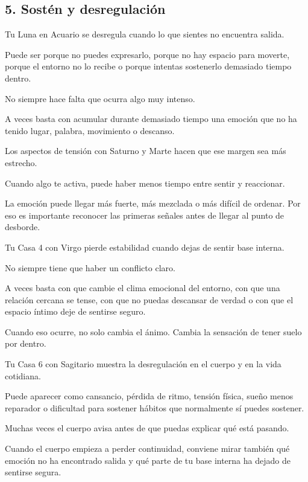 \documentclass[11pt,a4paper]{article}
\begin{document}
\vspace{0.8cm}

\subsection{5. Sostén y desregulación}

Tu Luna en Acuario se desregula cuando lo que sientes no encuentra salida.

Puede ser porque no puedes expresarlo, porque no hay espacio para moverte, porque el entorno no lo recibe o porque intentas sostenerlo demasiado tiempo dentro.

No siempre hace falta que ocurra algo muy intenso.

A veces basta con acumular durante demasiado tiempo una emoción que no ha tenido lugar, palabra, movimiento o descanso.

Los aspectos de tensión con Saturno y Marte hacen que ese margen sea más estrecho.

Cuando algo te activa, puede haber menos tiempo entre sentir y reaccionar.

La emoción puede llegar más fuerte, más mezclada o más difícil de ordenar. Por eso es importante reconocer las primeras señales antes de llegar al punto de desborde.

Tu Casa 4 con Virgo pierde estabilidad cuando dejas de sentir base interna.

No siempre tiene que haber un conflicto claro.

A veces basta con que cambie el clima emocional del entorno, con que una relación cercana se tense, con que no puedas descansar de verdad o con que el espacio íntimo deje de sentirse seguro.

Cuando eso ocurre, no solo cambia el ánimo. Cambia la sensación de tener suelo por dentro.

Tu Casa 6 con Sagitario muestra la desregulación en el cuerpo y en la vida cotidiana.

Puede aparecer como cansancio, pérdida de ritmo, tensión física, sueño menos reparador o dificultad para sostener hábitos que normalmente sí puedes sostener.

Muchas veces el cuerpo avisa antes de que puedas explicar qué está pasando.

Cuando el cuerpo empieza a perder continuidad, conviene mirar también qué emoción no ha encontrado salida y qué parte de tu base interna ha dejado de sentirse segura.
\end{document}
